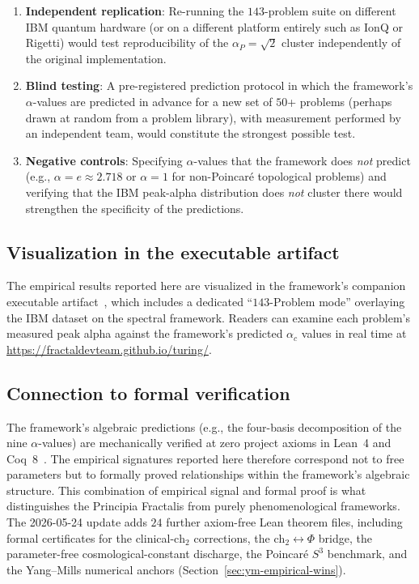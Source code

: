 \documentclass[11pt,a4paper]{article}
\theoremstyle{definition}
\begin{document}
\begin{enumerate}
\item \textbf{Independent replication}: Re-running the $143$-problem
suite on different IBM quantum hardware (or on a different platform
entirely such as IonQ or Rigetti) would test reproducibility of the
$\alpha_P = \sqrt{2}$ cluster independently of the original
implementation.

\item \textbf{Blind testing}: A pre-registered prediction protocol in
which the framework's $\alpha$-values are predicted in advance for a
new set of $50$+ problems (perhaps drawn at random from a problem
library), with measurement performed by an independent team, would
constitute the strongest possible test.

\item \textbf{Negative controls}: Specifying $\alpha$-values that the
framework does \emph{not} predict (e.g., $\alpha = e \approx 2.718$
or $\alpha = 1$ for non-Poincar\'e topological problems) and verifying
that the IBM peak-alpha distribution does \emph{not} cluster there
would strengthen the specificity of the predictions.
\end{enumerate}

\subsection{Visualization in the executable artifact}

The empirical results reported here are visualized in the framework's
companion executable artifact~\cite{cohen2026turing}, which includes a
dedicated ``$143$-Problem mode'' overlaying the IBM dataset on the
spectral framework. Readers can examine each problem's measured
peak alpha against the framework's predicted $\alpha_c$ values in real
time at \url{https://fractaldevteam.github.io/turing/}.

\subsection{Connection to formal verification}

The framework's algebraic predictions (e.g., the four-basis
decomposition of the nine $\alpha$-values) are mechanically verified
at zero project axioms in Lean~4 and Coq~8~\cite{cohen2025lean}. The
empirical signatures reported here therefore correspond not to free
parameters but to formally proved relationships within the framework's
algebraic structure. This combination of empirical signal and formal
proof is what distinguishes the Principia Fractalis from purely
phenomenological frameworks. The 2026-05-24 update adds $24$ further
axiom-free Lean theorem files, including formal certificates for
the clinical-$\mathrm{ch}_2$ corrections, the $\mathrm{ch}_2 \leftrightarrow
\Phi$ bridge, the parameter-free cosmological-constant discharge, the
Poincar\'e $S^3$ benchmark, and the Yang--Mills numerical anchors
(Section~\ref{sec:ym-empirical-wins}).
\end{document}
